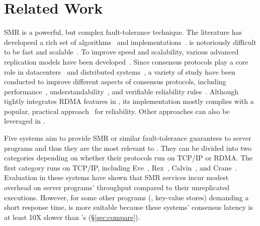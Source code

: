 \section{Related Work} \label{sec:related}


  SMR is a powerful, but 
complex fault-tolerance technique. The literature has developeed a rich set of
\paxos 
algorithms~\cite{paxos:practical,paxos,paxos:simple,paxos:complex,epaxos:sosp13}
and implementations~\cite{paxos:live,paxos:practical,chubby:osdi}. \paxos is 
notoriously difficult to be fast and scalable~\cite{ellis:thesis}. To improve 
speed and scalability, various advanced replication models have been 
developed~\cite{epaxos:sosp13,mencius:osdi08,scatter:sosp11,manos:hotdep10}. 
Since consensus protocols play a core role in 
datacenters~\cite{matei:hotcloud11, mesos:nsdi11, datacenter:os} and distributed 
systems~\cite{spanner:osdi12,mencius:osdi08}, a variety of study have been 
conducted to improve different aspects of consensus protocols, including 
performance~\cite{epaxos:sosp13,paxos:fast,dare:hpdc15}, 
understandability~\cite{raft:usenix14,paxos}, and verifiable reliability 
rules~\cite{modist:nsdi09,demeter:sosp11}. Although \xxx tightly integrates 
RDMA features in \paxos, its implementation mostly complies with a popular, 
practical approach~\cite{paxos:practical} for reliability. Other \paxos 
approaches can also be leveraged in \xxx.

Five systems aim to provide SMR or similar fault-tolerance guarantees to server 
programs and thus they are the most relevant to \xxx. They can be divided into 
two categories depending on whether their protocols run on TCP/IP or RDMA. 
The first category runs on TCP/IP, including Eve~\cite{eve:osdi12}, 
Rex~\cite{rex:eurosys14}, Calvin~\cite{calvin:sigmod12}, and 
Crane~\cite{crane:sosp15}. Evaluation in these systems have shown that SMR 
services incur modest overhead on server programs' throughput compared to their 
unreplicated executions. However, for some other programs (\eg, key-value 
stores) demanding a short response time, \xxx is more suitable because these 
systems' consensus latency is at least 10X slower than 
\xxx's (\S\ref{sec:compare}).


